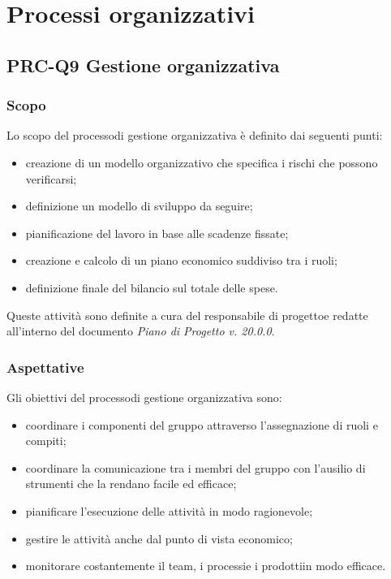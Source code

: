 \section{Processi organizzativi}
	\subsection{PRC-Q9 Gestione organizzativa}
		\subsubsection{Scopo}
			Lo scopo del processo\glosp di gestione organizzativa è definito dai seguenti punti:
			\begin{itemize}
				\item creazione di un modello organizzativo che specifica i rischi che possono verificarsi;
				\item definizione un modello di sviluppo da seguire;
				\item pianificazione del lavoro in base alle scadenze fissate;
				\item creazione e calcolo di un piano economico suddiviso tra i ruoli;
				\item definizione finale del bilancio sul totale delle spese.
			\end{itemize}
			Queste attività sono definite a cura del responsabile di progetto\glosp e redatte all'interno del documento \textit{Piano di Progetto v. 20.0.0}.
		\subsubsection{Aspettative}
			Gli obiettivi del processo\glosp di gestione organizzativa sono:
			\begin{itemize}
				\item coordinare i componenti del gruppo attraverso l'assegnazione di ruoli e compiti;
				\item coordinare la comunicazione tra i membri del gruppo con l'ausilio di strumenti che la rendano facile ed efficace;
				\item pianificare l'esecuzione delle attività in modo ragionevole;
				\item gestire le attività anche dal punto di vista economico;
				\item monitorare costantemente il team, i processi\glosp e i prodotti\glosp in modo efficace.
			\end{itemize}
